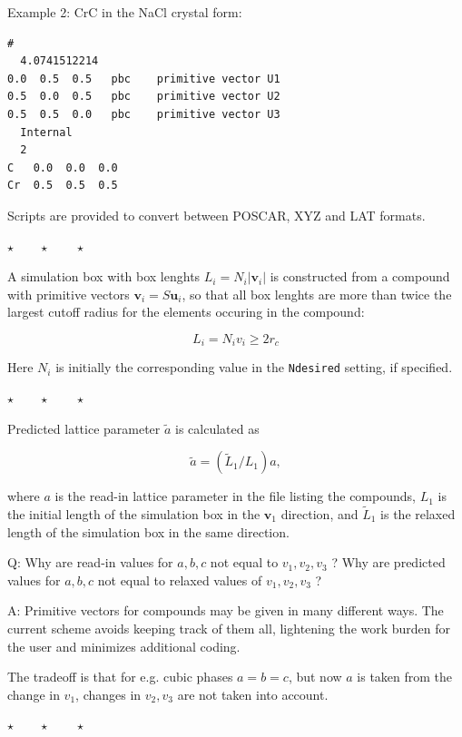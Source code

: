 \documentclass[a4paper,12pt,pdftex,onecolumn]{article}
\newcommand{\stars}{\begin{center}%
\vspace{1em plus 0.5em minus 0.5em}%
$\star \qquad \star \qquad \star$%
\vspace{1em plus 0.5em minus 0.5em}%
\end{center}}
\begin{document}
Example 2: CrC in the NaCl crystal form:

\begin{Verbatim}[fontsize=\relsize{-1},frame=single]
#
  4.0741512214
0.0  0.5  0.5   pbc    primitive vector U1
0.5  0.0  0.5   pbc    primitive vector U2
0.5  0.5  0.0   pbc    primitive vector U3
  Internal
  2
C   0.0  0.0  0.0
Cr  0.5  0.5  0.5
\end{Verbatim}


Scripts are provided to convert between POSCAR, XYZ and LAT formats.


\stars

A simulation box with box lenghts $L_i = N_i |\mathbf{v}_i|$ is constructed from
a compound with primitive vectors $\mathbf{v}_i = S \mathbf{u}_i$,
so that all box lenghts are more than twice the largest cutoff radius
for the elements occuring in the compound:

\begin{equation}
L_i = N_i v_i \ge 2 r_c
\end{equation}

Here $N_i$ is initially the corresponding value in the \verb+Ndesired+ setting,
if specified.

\stars

Predicted lattice parameter $\widetilde{a}$ is calculated as

\begin{equation}
\widetilde{a} = (\widetilde{L}_1 / L_1) a,
\end{equation}

where $a$ is the read-in lattice parameter in the file listing the compounds,
$L_1$ is the initial length of the simulation box in the $\mathbf{v}_1$ direction, and
$\widetilde{L}_1$ is the relaxed length of the simulation box in the same direction.

Q: Why are read-in values for $a,b,c$ not equal to $v_1,v_2,v_3$ ?
Why are predicted values for $a,b,c$ not equal to relaxed values of $v_1,v_2,v_3$ ?

A: Primitive vectors for compounds may be given in many different ways.
The current scheme avoids keeping track of them all, lightening the work
burden for the user and minimizes additional coding.




The tradeoff is that for e.g. cubic phases $a=b=c$, but now $a$ is taken
from the change in $v_1$, changes in $v_2,v_3$ are not taken into
account.




\stars
\end{document}
